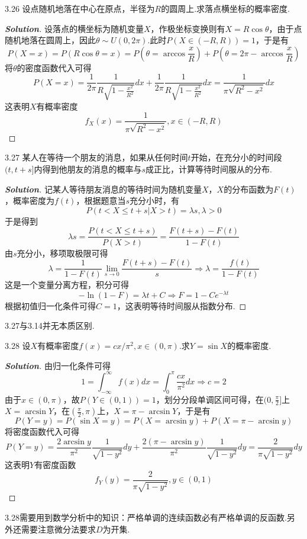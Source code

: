 \documentclass[10pt, a4paper, oneside]{ctexart}
\newenvironment{solution}{\begin{proof}[\bf Solution]}{\end{proof}}
\begin{document}
3.26 设点随机地落在中心在原点，半径为$R$的圆周上.求落点横坐标的概率密度.
\begin{solution}
设落点的横坐标为随机变量$X$，作极坐标变换则有$X=R\cos \theta$，由于点随机地落在圆周上，因此$\theta\sim U(0,2\pi)$.此时$P(X\in (-R,R))=1$，于是有
\[P(X = x) = P(R\cos \theta  = x) = P(\theta  = \arccos \frac{x}{R}) + P(\theta  = 2\pi  - \arccos \frac{x}{R})\]
将$\theta$的密度函数代入可得
\[P(X = x) = \frac{1}{{2\pi }}\frac{1}{{R\sqrt {1 - \frac{{{x^2}}}{{{R^2}}}} }}dx + \frac{1}{{2\pi }}\frac{1}{{R\sqrt {1 - \frac{{{x^2}}}{{{R^2}}}} }}dx = \frac{1}{{\pi \sqrt {{R^2} - {x^2}} }}dx\]
这表明$X$有概率密度
\[{f_X}(x) = \frac{1}{{\pi \sqrt {{R^2} - {x^2}} }},x \in ( - R,R)\]
\end{solution}

3.27 某人在等待一个朋友的消息，如果从任何时间$t$开始，在充分小的时间段$(t,t+s]$内得到他朋友的消息的概率与$s$成正比，计算等待时间服从的分布.
\begin{solution}
记某人等待朋友消息的等待时间为随机变量$X$，$X$的分布函数为$F(t)$，概率密度为$f(t)$，根据题意当$s$充分小时，有
    \[P(t < X \leqslant t + s|X>t) = \lambda s,\lambda  > 0\]
于是得到
    \[\lambda s = \frac{{P(t < X \leqslant t + s)}}{{P(X>t)}} = \frac{{F(t + s) - F(t)}}{{1 - F(t)}}\]
由$s$充分小，移项取极限可得
    \[\lambda  = \frac{1}{{1 - F(t)}}\mathop {\lim }\limits_{s \to 0} \frac{{F(t + s) - F(t)}}{s} \Rightarrow \lambda  = \frac{{f(t)}}{{1 - F(t)}}\]
这是一个变量分离方程，积分可得
    \[-\ln (1 - F) = \lambda t + C \Rightarrow F = 1 - C{e^{-\lambda t}}\]
根据初值归一化条件可得$C=1$，这表明等待时间服从指数分布.
\end{solution}
\begin{remark}
3.27与3.14并无本质区别.
\end{remark}

3.28 设$X$有概率密度$f(x)=cx/\pi^2,x\in (0,\pi)$.求$Y=\sin X$的概率密度.
\begin{solution}
由归一化条件可得
\[1 = \int_{ - \infty }^\infty  {f(x)dx}  = \int_0^\pi  {\frac{{cx}}{{{\pi ^2}}}dx}  \Rightarrow c = 2\]
由于$x\in (0,\pi)$，故$P(Y\in (0,1))=1$，划分分段单调区间可得，在$(0,\frac{\pi}{2}]$上$X=\arcsin Y$，在$(\frac{\pi}{2},\pi)$上，$X=\pi-\arcsin Y$，于是有
\[P(Y = y) = P(\sin X = y) = P(X = \arcsin y) + P(X = \pi  - \arcsin y)\]
将密度函数代入可得
\[P(Y = y) = \frac{{2\arcsin y}}{{{\pi ^2}}}\frac{1}{{\sqrt {1 - {y^2}} }}dy + \frac{{2(\pi  - \arcsin y)}}{{{\pi ^2}}}\frac{1}{{\sqrt {1 - {y^2}} }}dy = \frac{2}{{\pi \sqrt {1 - {y^2}} }}dy\]
这表明$Y$有密度函数
\[{f_Y}(y) = \frac{2}{{\pi \sqrt {1 - {y^2}} }},y\in(0,1)\]
\end{solution}
\begin{remark}
3.28需要用到数学分析中的知识：严格单调的连续函数必有严格单调的反函数.另外还需要注意微分法要求$D$为开集.
\end{remark}
\end{document}
